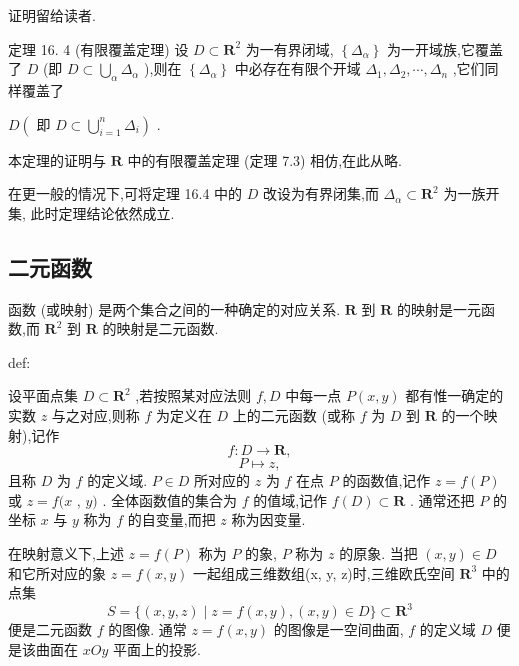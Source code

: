 证明留给读者.

定理 16. 4 (有限覆盖定理) 设 \(D \subset  {\mathbf{R}}^{2}\) 为一有界闭域, \(\left\{  {\Delta }_{\alpha }\right\}\) 为一开域族,它覆盖了 \(D\) (即 \(D \subset  \mathop{\bigcup }\limits_{\alpha }{\Delta }_{\alpha }\) ),则在 \(\left\{  {\Delta }_{\alpha }\right\}\) 中必存在有限个开域 \({\Delta }_{1},{\Delta }_{2},\cdots ,{\Delta }_{n}\) ,它们同样覆盖了

\(D\left( {\text{ 即 }D \subset  \mathop{\bigcup }\limits_{{i = 1}}^{n}{\Delta }_{i}}\right)\) .

本定理的证明与 \(\mathbf{R}\) 中的有限覆盖定理 (定理 7.3) 相仿,在此从略.

在更一般的情况下,可将定理 16.4 中的 \(D\) 改设为有界闭集,而 \({\Delta }_{\alpha } \subset  {\mathbf{R}}^{2}\) 为一族开集, 此时定理结论依然成立.

\subsection{二元函数}

函数 (或映射) 是两个集合之间的一种确定的对应关系. \(\mathbf{R}\) 到 \(\mathbf{R}\) 的映射是一元函数,而 \({\mathbf{R}}^{2}\) 到 \(\mathbf{R}\) 的映射是二元函数.

\begin{definition}{}{def:}

\end{definition}
设平面点集 \(D \subset  {\mathbf{R}}^{2}\) ,若按照某对应法则 \(f,D\) 中每一点 \(P\left( {x,y}\right)\) 都有惟一确定的实数 \(z\) 与之对应,则称 \(f\) 为定义在 \(D\) 上的二元函数 (或称 \(f\) 为 \(D\) 到 \(\mathbf{R}\) 的一个映射),记作
\[
f : D \rightarrow  \mathbf{R},
\]
\[
P \mapsto  z, \tag{7}
\]
且称 \(D\) 为 \(f\) 的定义域. \(P \in  D\) 所对应的 \(z\) 为 \(f\) 在点 \(P\) 的函数值,记作 \(z = f\left( P\right)\) 或 \(z = f(x\) , \(y)\) . 全体函数值的集合为 \(f\) 的值域,记作 \(f\left( D\right)  \subset  \mathbf{R}\) . 通常还把 \(P\) 的坐标 \(x\) 与 \(y\) 称为 \(f\) 的自变量,而把 \(z\) 称为因变量.

在映射意义下,上述 \(z = f\left( P\right)\) 称为 \(P\) 的象, \(P\) 称为 \(z\) 的原象. 当把 \(\left( {x,y}\right)  \in  D\) 和它所对应的象 \(z = f\left( {x,y}\right)\) 一起组成三维数组(x, y, z)时,三维欧氏空间 \({\mathbf{R}}^{3}\) 中的点集
\[
S = \{ \left( {x,y,z}\right)  \mid  z = f\left( {x,y}\right) ,\left( {x,y}\right)  \in  D\}  \subset  {\mathbf{R}}^{3}
\]
便是二元函数 \(f\) 的图像. 通常 \(z = f\left( {x,y}\right)\) 的图像是一空间曲面, \(f\) 的定义域 \(D\) 便是该曲面在 \({xOy}\) 平面上的投影.

